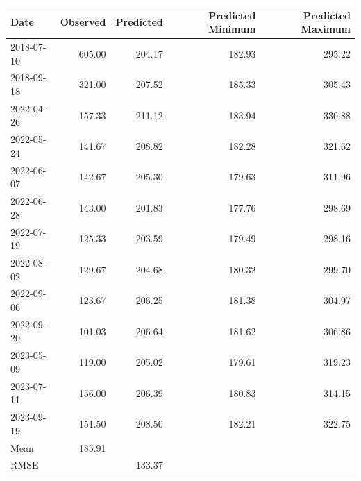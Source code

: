 \begin{table}[ht]
\centering
\begin{tabular}{lrrrr}
  \hline
Date & Observed & Predicted & Predicted Minimum & Predicted Maximum \\ 
  \hline
2018-07-10 & 605.00 & 204.17 & 182.93 & 295.22 \\ 
  2018-09-18 & 321.00 & 207.52 & 185.33 & 305.43 \\ 
  2022-04-26 & 157.33 & 211.12 & 183.94 & 330.88 \\ 
  2022-05-24 & 141.67 & 208.82 & 182.28 & 321.62 \\ 
  2022-06-07 & 142.67 & 205.30 & 179.63 & 311.96 \\ 
  2022-06-28 & 143.00 & 201.83 & 177.76 & 298.69 \\ 
  2022-07-19 & 125.33 & 203.59 & 179.49 & 298.16 \\ 
  2022-08-02 & 129.67 & 204.68 & 180.32 & 299.70 \\ 
  2022-09-06 & 123.67 & 206.25 & 181.38 & 304.97 \\ 
  2022-09-20 & 101.03 & 206.64 & 181.62 & 306.86 \\ 
  2023-05-09 & 119.00 & 205.02 & 179.61 & 319.23 \\ 
  2023-07-11 & 156.00 & 206.39 & 180.83 & 314.15 \\ 
  2023-09-19 & 151.50 & 208.50 & 182.21 & 322.75 \\ 
  Mean & 185.91 &  &  &  \\ 
  RMSE &  & 133.37 &  &  \\ 
   \hline
\end{tabular}
\end{table}
